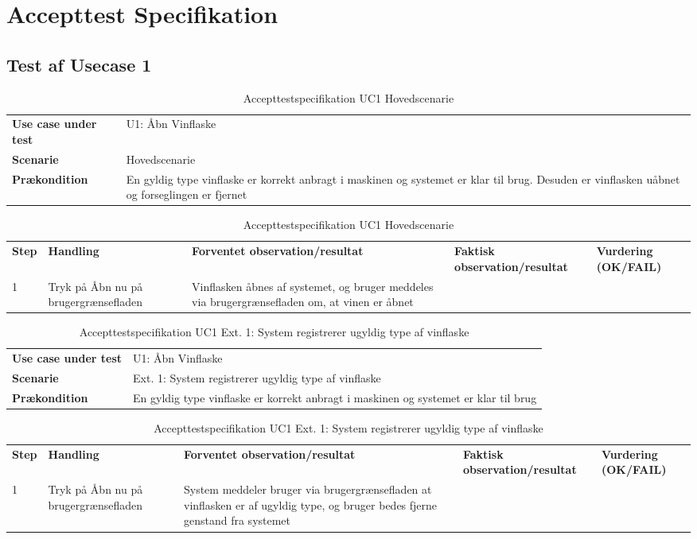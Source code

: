 \chapter{Accepttest Specifikation}
\section{Test af Usecase 1}
\begin{table}[H]
	\centering
	\caption{Accepttestspecifikation UC1 Hovedscenarie}
	\label{ATUC1:Hovedscenarie}
	\begin{tabular}{ p{80pt}  p{320pt} }\hline
		\rowcolor{white}	
		\textbf{Use case under test} & U1: Åbn Vinflaske \\
		\rowcolor{lightgray}
		\textbf{Scenarie} & Hovedscenarie \\\rowcolor{white}	
		\textbf{Prækondition} &
		En gyldig type vinflaske er korrekt anbragt i maskinen og systemet er klar til brug. Desuden
		er vinflasken uåbnet og forseglingen er fjernet
 \\
		\hline
	\end{tabular}
	\begin{tabular}{  p{26pt} p{100pt}  p{101pt} | p{67pt} | p{68pt}}
		\textbf{Step} & \textbf{Handling} & \textbf{Forventet observation/resultat} & \textbf{Faktisk observation/resultat} & \textbf{Vurdering (OK/FAIL)}\\
		1 & Tryk på Åbn nu på
		brugergrænsefladen & Vinflasken åbnes af
		systemet, og bruger
		meddeles via
		brugergrænsefladen
		om, at vinen er åbnet &  &  \\
		\hline
	\end{tabular}
\end{table}

\begin{table}[H]
	\centering
	\caption{Accepttestspecifikation UC1 Ext. 1: System registrerer ugyldig type af vinflaske}
	\label{ATUC1:Ext1}
	\begin{tabular}{ p{80pt}  p{320pt} }\hline
		\rowcolor{lightgray}	
		\textbf{Use case under test} & U1: Åbn Vinflaske \\
		\rowcolor{white}
		\textbf{Scenarie} & Ext. 1: System registrerer ugyldig type af vinflaske \\\rowcolor{lightgray}	
		\textbf{Prækondition} &
		En gyldig type vinflaske er korrekt anbragt i maskinen og systemet er klar til brug \\
		\hline
	\end{tabular}
	\begin{tabular}{  p{26pt} p{100pt}  p{101pt} | p{67pt} | p{68pt}}
		\textbf{Step} & \textbf{Handling} & \textbf{Forventet observation/resultat} & \textbf{Faktisk observation/resultat} & \textbf{Vurdering (OK/FAIL)}\\
		1 & Tryk på Åbn nu på
		brugergrænsefladen & System meddeler bruger
		via brugergrænsefladen
		at vinflasken er af
		ugyldig type, og bruger
		bedes fjerne genstand
		fra systemet
 &  &  \\
		\hline
	\end{tabular}
\end{table}

